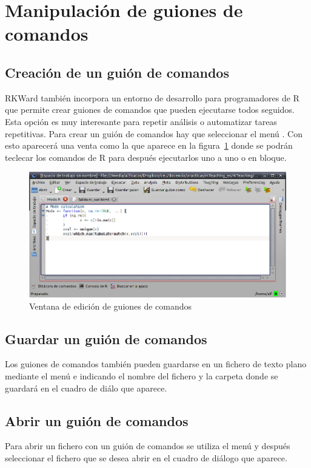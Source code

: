 \section{Manipulación de guiones de comandos}

\subsection{Creación de un guión de comandos}
RKWard también incorpora un entorno de desarrollo para programadores de R que permite crear guiones de comandos que
pueden ejecutarse todos seguidos.
Esta opción es muy interesante para repetir análisis o automatizar tareas repetitivas.
Para crear un guión de comandos hay que seleccionar el menú .
Con esto aparecerá una venta como la que aparece en la figura~\ref{g:guiones_comandos} donde se podrán teclecar los
comandos de R para después ejecutarlos uno a uno o en bloque.

\begin{figure}[htp]
\begin{center}
  \includegraphics[scale=0.6]{introduccion_r/img/guiones_comandos}
  \caption{Ventana de edición de guiones de comandos}
  \label{g:guiones_comandos}
\end{center}
\end{figure}


\subsection{Guardar un guión de comandos}
Los guiones de comandos también pueden guardarse en un fichero de texto plano mediante el menú
 e indicando el nombre del fichero y la carpeta donde se guardará en el
cuadro de diálo que aparece.


\subsection{Abrir un guión de comandos}
Para abrir un fichero con un guión de comandos se utiliza el menú  y
después seleccionar el fichero que se desea abrir en el cuadro de diálogo que aparece. 


